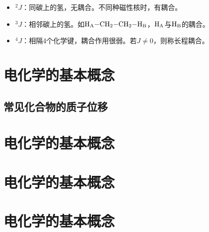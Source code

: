 \begin{itemize}
	\item $^{2}J$：同碳上的氢，无耦合。不同种磁性核时，有耦合。
	\item $^{3}J$：相邻碳上的氢。如$\ce{H_A-CH2-CH2-H_B}$，$\ce{H_A}$与$\ce{H_B}$的耦合。
	\item $^{4}J$：相隔4个化学键，耦合作用很弱。若$J\neq 0$，则称长程耦合。
\end{itemize}

\section{电化学的基本概念}

\subsection{常见化合物的质子位移}

\section{电化学的基本概念}

\section{电化学的基本概念}

\section{电化学的基本概念}
